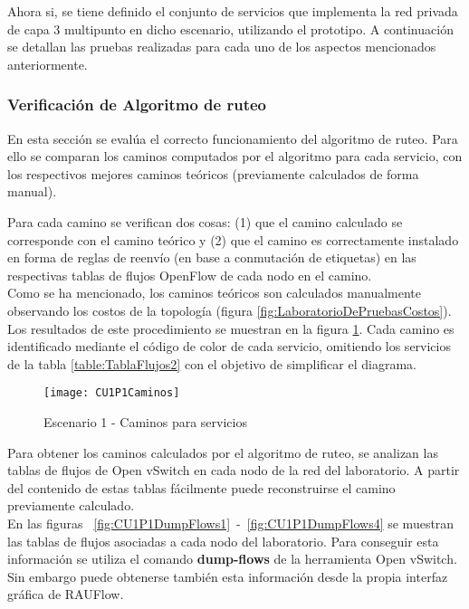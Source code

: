 Ahora si, se tiene definido el conjunto de servicios que implementa la red privada de capa 3 multipunto en dicho escenario, utilizando el prototipo. A continuaci\'on se detallan las pruebas realizadas para cada uno de los aspectos mencionados anteriormente.

\subsubsection{Verificaci\'on de Algoritmo de ruteo}
En esta secci\'on se eval\'ua el correcto funcionamiento del algoritmo de ruteo. Para ello se comparan los caminos computados por el algoritmo para cada servicio, con los respectivos mejores caminos te\'oricos (previamente calculados de forma manual). 

Para cada camino se verifican dos cosas: (1) que el camino calculado se corresponde con el camino te\'orico y (2) que el camino es correctamente instalado en forma de reglas de reenvío (en base a conmutaci\'on de etiquetas) en las respectivas tablas de flujos OpenFlow de cada nodo en el camino.\\

Como se ha mencionado, los caminos te\'oricos son calculados manualmente observando los costos de la topolog\'ia (figura \ref{fig:LaboratorioDePruebasCostos}). Los resultados de este procedimiento se muestran en la figura \ref{fig:CUP1Caminos}. Cada camino es identificado mediante el código de color de cada servicio, omitiendo los servicios de la tabla \ref{table:TablaFlujos2} con el objetivo de simplificar el diagrama.\\

\begin{figure}[ht!] 
\centering    
\texttt{[image: CU1P1Caminos]}
\caption[Escenario 1 - Caminos para servicios]{Escenario 1 - Caminos para servicios}
\label{fig:CUP1Caminos}
\end{figure}

Para obtener los caminos calculados por el algoritmo de ruteo, se analizan las tablas de flujos de Open vSwitch en cada nodo de la red del laboratorio. A partir del contenido de estas tablas fácilmente puede reconstruirse el camino previamente calculado.\\

En las figuras ~\ref{fig:CU1P1DumpFlows1}~-~\ref{fig:CU1P1DumpFlows4} se muestran las tablas de flujos asociadas a cada nodo del laboratorio. Para conseguir esta informaci\'on se utiliza el comando \textbf{dump-flows} de la herramienta Open vSwitch. Sin embargo puede obtenerse tambi\'en esta informaci\'on desde la propia interfaz gr\'afica de RAUFlow.\\

